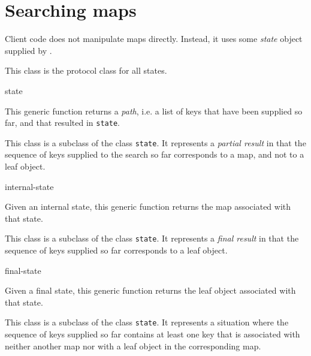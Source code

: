 \chapter{Searching maps}

Client code does not manipulate maps directly.  Instead, it uses some
\emph{state} object supplied by \sysname{}.


This class is the protocol class for all states.

 {state}

This generic function returns a \emph{path}, i.e. a list of keys that
have been supplied so far, and that resulted in \texttt{state}.


This class is a subclass of the class \texttt{state}.  It represents a
\emph{partial result} in that the sequence of keys supplied to the
search so far corresponds to a map, and not to a leaf object.

 {internal-state}

Given an internal state, this generic function returns the map
associated with that state.


This class is a subclass of the class \texttt{state}.  It represents a
\emph{final result} in that the sequence of keys supplied so far
corresponds to a leaf object.

 {final-state}

Given a final state, this generic function returns the leaf object
associated with that state.


This class is a subclass of the class \texttt{state}.  It represents a
situation where the sequence of keys supplied so far contains at least
one key that is associated with neither another map nor with a leaf
object in the corresponding map.

